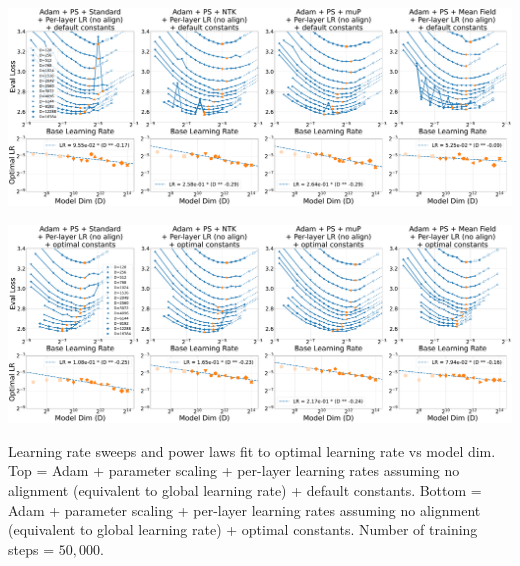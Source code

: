 \documentclass{article}
\theoremstyle{plain}
\theoremstyle{definition}
\theoremstyle{remark}
\begin{document}
\thispagestyle{plain}
\begin{SidewaysFigure}
\includegraphics[width=0.98\linewidth]{icml2024/figures/lr_sweeps/appendix/adam_ps/adam_ps+50k_steps.pdf}

\figvspace

\includegraphics[width=0.98\linewidth]{icml2024/figures/lr_sweeps/appendix/adam_ps/adam_ps+50k_steps_optimal_constants_only.pdf}
\caption{Learning rate sweeps and power laws fit to optimal learning rate vs model dim. Top = Adam + parameter scaling + per-layer learning rates assuming no alignment (equivalent to global learning rate) + default constants. Bottom = Adam + parameter scaling + per-layer learning rates assuming no alignment (equivalent to global learning rate) + optimal constants. Number of training steps = $50{,}000$.}
\label{fig:lr_sweep_adam_ps_no_align}
\end{SidewaysFigure}
\clearpage
\end{document}
